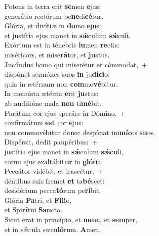 \evenverse Potens in terra erit \textbf{se}men \textbf{e}jus:~\*\\
\evenverse generátio rectórum be\textbf{ne}di\textbf{cé}tur.\\
\oddverse Glória, et divítiæ in \textbf{do}mo \textbf{e}jus:~\*\\
\oddverse et justítia ejus manet in \textbf{sǽ}culum \textbf{sǽ}culi.\\
\evenverse Exórtum est in ténebris \textbf{lu}men \textbf{re}ctis:~\*\\
\evenverse miséricors, et mise\textbf{rá}tor, et \textbf{ju}stus.\\
\oddverse Jucúndus homo qui miserétur et cómmodat,~+\\
\oddverse  dispónet sermónes suos \textbf{in} ju\textbf{dí}\textbf{ci}o:~\*\\
\oddverse quia in ætérnum non \textbf{com}mo\textbf{vé}bitur.\\
\evenverse In memória ætérna \textbf{e}rit \textbf{ju}stus:~\*\\
\evenverse ab auditióne mala \textbf{non} ti\textbf{mé}bit.\\
\oddverse Parátum cor ejus speráre in Dómino,~+\\
\oddverse  confirmátum \textbf{est} cor \textbf{e}jus:~\*\\
\oddverse non commovébitur donec despíciat ini\textbf{mí}cos \textbf{su}os.\\
\evenverse Dispérsit, dedit paupéribus:~+\\
\evenverse  justítia ejus manet in \textbf{sǽ}culum \textbf{sǽ}\textbf{cu}li,~\*\\
\evenverse cornu ejus exaltábi\textbf{tur} in \textbf{gló}ria.\\
\oddverse Peccátor vidébit, et irascétur,~+\\
\oddverse  déntibus suis fremet \textbf{et} ta\textbf{bé}scet:~\*\\
\oddverse desidérium pecca\textbf{tó}rum pe\textbf{rí}bit.\\
\evenverse Glória \textbf{Pa}tri, et \textbf{Fí}\textbf{li}o,~\*\\
\evenverse et Spi\textbf{rí}tui \textbf{San}cto.\\
\oddverse Sicut erat in princípio, et \textbf{nunc}, et \textbf{sem}per,~\*\\
\oddverse et in sǽcula sæcu\textbf{ló}rum. \textbf{A}men.\\
